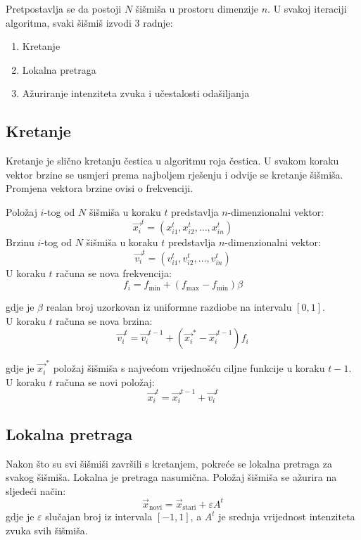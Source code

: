 Pretpostavlja se da postoji $N$ šišmiša u prostoru dimenzije $n$. U svakoj iteraciji algoritma, svaki šišmiš izvodi 3 radnje:
\begin{enumerate}
    \item Kretanje
    \item Lokalna pretraga
    \item Ažuriranje intenziteta zvuka i učestalosti odašiljanja
\end{enumerate}





\subsection{Kretanje}
\hspace{\parindent}Kretanje je slično kretanju čestica u algoritmu roja čestica. U svakom koraku vektor brzine se usmjeri prema najboljem rješenju i odvije se kretanje šišmiša. Promjena vektora brzine ovisi o frekvenciji. 

Položaj $i$-tog od $N$ šišmiša u koraku $t$ predstavlja $n$-dimenzionalni vektor:
\begin{equation}
	\vec{x_i}^t = (x_{i1}^t, x_{i2}^t, \dots, x_{in}^t)
\end{equation}
Brzinu $i$-tog od $N$ šišmiša u koraku $t$ predstavlja $n$-dimenzionalni vektor:
\begin{equation}
	\vec{v_i}^t = (v_{i1}^t, v_{i2}^t, \dots, v_{in}^t)
\end{equation}
U koraku $t$ računa se nova frekvencija:
\begin{equation}
	f_i = f_{\text{min}} + (f_{\text{max}} - f_{\text{min}})\beta
\end{equation}

gdje je $\beta$ realan broj uzorkovan iz uniformne razdiobe na intervalu $[0,1]$.\\
U koraku $t$ računa se nova brzina:
\begin{equation}
	\vec{v_i}^t = \vec{v_i}^{t-1} + (\vec{x_i}^* - \vec{x_i}^{t-1})f_i
\end{equation}

gdje je $\vec{x_i}^*$ položaj šišmiša s najvećom vrijednošću ciljne funkcije u koraku $t-1$.\\
U koraku $t$ računa se novi položaj:
\begin{equation}
	\vec{x_i}^t = \vec{x_i}^{t-1} + \vec{v_i}^{t}
\end{equation}

\subsection{Lokalna pretraga}
\hspace{\parindent}Nakon što su svi šišmiši završili s kretanjem, pokreće se lokalna pretraga za svakog šišmiša. Lokalna je pretraga nasumična. Položaj šišmiša se ažurira na sljedeći način:
\begin{equation}
	\vec{x}_\text{novi} = \vec{x}_\text{stari} + \varepsilon A^t
\end{equation}
gdje je $\varepsilon$ slučajan broj iz intervala $[-1, 1]$, a $A^t$ je srednja vrijednost intenziteta zvuka svih šišmiša.


